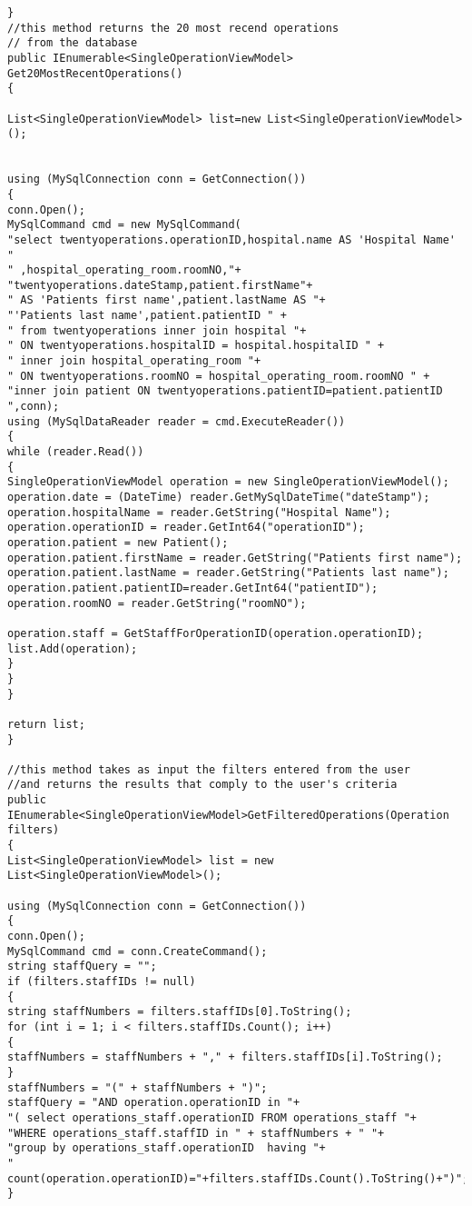 \begin{lstlisting}
}
//this method returns the 20 most recend operations 
// from the database
public IEnumerable<SingleOperationViewModel> Get20MostRecentOperations()
{

List<SingleOperationViewModel> list=new List<SingleOperationViewModel>();


using (MySqlConnection conn = GetConnection())
{
conn.Open();
MySqlCommand cmd = new MySqlCommand(
"select twentyoperations.operationID,hospital.name AS 'Hospital Name' "
" ,hospital_operating_room.roomNO,"+
"twentyoperations.dateStamp,patient.firstName"+
" AS 'Patients first name',patient.lastName AS "+
"'Patients last name',patient.patientID " +
" from twentyoperations inner join hospital "+
" ON twentyoperations.hospitalID = hospital.hospitalID " +
" inner join hospital_operating_room "+
" ON twentyoperations.roomNO = hospital_operating_room.roomNO " +
"inner join patient ON twentyoperations.patientID=patient.patientID ",conn);
using (MySqlDataReader reader = cmd.ExecuteReader())
{
while (reader.Read())
{
SingleOperationViewModel operation = new SingleOperationViewModel();
operation.date = (DateTime) reader.GetMySqlDateTime("dateStamp");
operation.hospitalName = reader.GetString("Hospital Name");
operation.operationID = reader.GetInt64("operationID");
operation.patient = new Patient();
operation.patient.firstName = reader.GetString("Patients first name");
operation.patient.lastName = reader.GetString("Patients last name");
operation.patient.patientID=reader.GetInt64("patientID");
operation.roomNO = reader.GetString("roomNO");

operation.staff = GetStaffForOperationID(operation.operationID);
list.Add(operation);
}
}
}

return list;
}

//this method takes as input the filters entered from the user
//and returns the results that comply to the user's criteria
public IEnumerable<SingleOperationViewModel>GetFilteredOperations(Operation filters)
{
List<SingleOperationViewModel> list = new List<SingleOperationViewModel>();

using (MySqlConnection conn = GetConnection())
{
conn.Open();
MySqlCommand cmd = conn.CreateCommand();
string staffQuery = "";
if (filters.staffIDs != null)
{
string staffNumbers = filters.staffIDs[0].ToString();
for (int i = 1; i < filters.staffIDs.Count(); i++)
{
staffNumbers = staffNumbers + "," + filters.staffIDs[i].ToString();
}
staffNumbers = "(" + staffNumbers + ")";
staffQuery = "AND operation.operationID in "+
"( select operations_staff.operationID FROM operations_staff "+
"WHERE operations_staff.staffID in " + staffNumbers + " "+
"group by operations_staff.operationID  having "+
" count(operation.operationID)="+filters.staffIDs.Count().ToString()+")";
}



\end{lstlisting}
